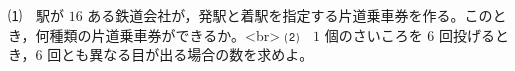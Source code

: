⑴　駅が $16$ ある鉄道会社が，発駅と着駅を指定する片道乗車券を作る。このとき，何種類の片道乗車券ができるか。<br>
⑵　$1$ 個のさいころを $6$ 回投げるとき，$6$ 回とも異なる目が出る場合の数を求めよ。